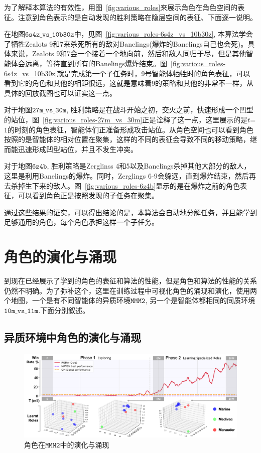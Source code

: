 为了解释本算法的有效性，用图~\ref{fig:various_roles}来展示角色在角色空间的表征。注意到角色表示的是自动发现的胜利策略在隐层空间的表征、下面逐一说明。

在地图$\mathtt{6s4z\_vs\_10b30z}$中，见图~\ref{fig:various_roles-6s4z_vs_10b30z}, 本算法学会了牺牲Zealots 9和7来杀死所有的敌对Banelings(爆炸的Banelings自己也会死)。具体来说，Zealots 9和7会一个接着一个地向前，然后和敌人同归于尽，但是其他智能体会远离，等待直到所有的Banelings爆炸结束。图~\ref{fig:various_roles-6s4z_vs_10b30z}就是完成第一个子任务时，9号智能体牺牲时的角色表征，可以看到它的角色和其他的相距很远，这就是意味着9的策略和其他的非常不一样，从具体的回放截图也可以证实这一点。

对于地图$\mathtt{27m\_vs\_30m}$, 胜利策略是在战斗开始之初，交火之前，快速形成一个凹型的站位，图~\ref{fig:various_roles-27m_vs_30m}正是诠释了这一点，这里展示的是$t$=$1$的时刻的角色表征，智能体们正准备形成攻击站位。从角色空间也可以看到角色按照的是智能体的相对位置在聚集，这样的不同的表征会导致不同的移动策略，继而能迅速形成凹型站位，并且不发生冲突。

对于地图$\mathtt{6z4b}$, 胜利策略是Zerglinss 4和5以及Banelings杀掉其他大部分的敌人，这里是利用Banelings的爆炸。同时，Zerglings 6-9会躲远，直到爆炸结束，然后再去杀掉生下来的敌人。图~\ref{fig:various_roles-6z4b}显示的是在爆炸之前的角色表征，可以看到角色正是按照发现的子任务在聚集。

通过这些结果的证实，可以得出结论的是，本算法会自动地分解任务，并且能学到足够通用的角色，每个角色承担这样一个子任务。

\section{角色的演化与涌现}\label{sec:role-evolution}
到现在已经展示了学到的角色的表征和算法的性能，但是角色和算法的性能的关系仍然不明确。为了弥补这个，这里在训练过程中可视化角色的涌现和演化，使用两个地图，一个是有不同智能体的异质环境$\mathtt{MMM2}$, 另一个是智能体都相同的同质环境$\mathtt{10m\_vs\_11m}$.下面分别叙述。

\subsection{异质环境中角色的演化与涌现}
\begin{figure}
  \centering
  \includegraphics[width=\linewidth]{figures/evolution/evolution_MMM2.png}
  \caption{角色在$\mathtt{MMM2}$中的演化与涌现}
  \label{fig:role_evolution-heter}
\end{figure}


